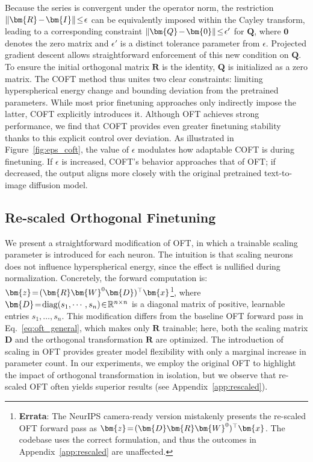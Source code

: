 {Because the series is convergent under the operator norm, the restriction $\thickmuskip=2mu \medmuskip=2mu\|\bm{R}-\bm{I}\|\leq\epsilon$ can be equivalently imposed within the Cayley transform, leading to a corresponding constraint $\thickmuskip=2mu \medmuskip=2mu \|\bm{Q}-\bm{0}\|\leq\epsilon'$ for $\bm{Q}$, where $\bm{0}$ denotes the zero matrix and $\epsilon'$ is a distinct tolerance parameter from $\epsilon$. Projected gradient descent allows straightforward enforcement of this new condition on $\bm{Q}$. To ensure the initial orthogonal matrix $\bm{R}$ is the identity, $\bm{Q}$ is initialized as a zero matrix. The COFT method thus unites two clear constraints: limiting hyperspherical energy change and bounding deviation from the pretrained parameters. While most prior finetuning approaches only indirectly impose the latter, COFT explicitly introduces it. Although OFT achieves strong performance, we find that COFT provides even greater finetuning stability thanks to this explicit control over deviation. As illustrated in Figure~\ref{fig:eps_coft}, the value of $\epsilon$ modulates how adaptable COFT is during finetuning. If $\epsilon$ is increased, COFT's behavior approaches that of OFT; if decreased, the output aligns more closely with the original pretrained text-to-image diffusion model.

\subsection{Re-scaled Orthogonal Finetuning}

We present a straightforward modification of OFT, in which a trainable scaling parameter is introduced for each neuron. The intuition is that scaling neurons does not influence hyperspherical energy, since the effect is nullified during normalization. Concretely, the forward computation is: $\thickmuskip=2mu \medmuskip=2mu\bm{z}=(\bm{R}\bm{W}^0\bm{D})^\top\bm{x}$\footnote{\textbf{Errata}: The NeurIPS camera-ready version mistakenly presents the re-scaled OFT forward pass as $\thickmuskip=2mu \medmuskip=2mu\bm{z}=(\bm{D}\bm{R}\bm{W}^0)^\top\bm{x}$. The codebase uses the correct formulation, and thus the outcomes in Appendix~\ref{app:rescaled} are unaffected.}, where $\thickmuskip=2mu \medmuskip=2mu\bm{D}=\text{diag}(s_1,\cdots,s_n)\in\mathbb{R}^{n\times n}$ is a diagonal matrix of positive, learnable entries $s_1, \ldots, s_n$. This modification differs from the baseline OFT forward pass in Eq.~\eqref{eq:oft_general}, which makes only $\bm{R}$ trainable; here, both the scaling matrix $\bm{D}$ and the orthogonal transformation $\bm{R}$ are optimized. The introduction of scaling in OFT provides greater model flexibility with only a marginal increase in parameter count. In our experiments, we employ the original OFT to highlight the impact of orthogonal transformation in isolation, but we observe that re-scaled OFT often yields superior results (see Appendix~\ref{app:rescaled}).

}
